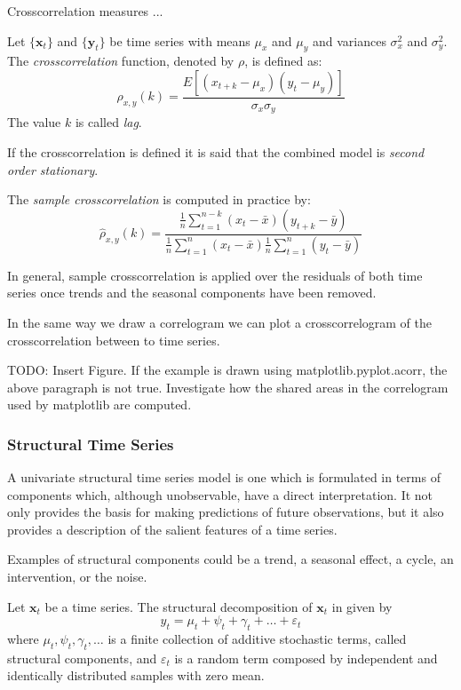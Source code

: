 Crosscorrelation measures ...

\begin{definition}
Let $\{\mathbf{x}_t\}$ and $\{\mathbf{y}_t\}$ be time series with means $\mu_x$ and $\mu_y$ and variances $\sigma_x^2$ and $\sigma_y^2$. The \emph{crosscorrelation} function, denoted by $\rho$, is defined as:
\[
\rho_{x,y}(k) = \frac{E\left[\left(x_{t+k}-\mu_x\right)\left(y_t-\mu_y\right)\right]}{\sigma_x \sigma_y}
\]
The value $k$ is called \emph{lag}.
\end{definition}

If the crosscorrelation is defined it is said that the combined model is \emph{second order stationary}.

The \emph{sample crosscorrelation} is computed in practice by:
\[
\hat{\rho}_{x,y}(k) = \frac{ \frac{1}{n}\sum_{t=1}^{n-k}\left(x_{t}-\bar{x}\right)\left(y_{t+k}-\bar{y}\right) }{ \frac{1}{n}\sum_{t=1}^{n}\left(x_{t}-\bar{x}\right) \frac{1}{n}\sum_{t=1}^{n}\left(y_{t}-\bar{y}\right) }
\]

In general, sample crosscorrelation is applied over the residuals of both time series once trends and the seasonal components have been removed.

In the same way we draw a correlogram we can plot a crosscorrelogram of the crosscorrelation between to time series.

\begin{example}
{\color {red} TODO: Insert Figure. If the example is drawn using matplotlib.pyplot.acorr, the above paragraph is not true. Investigate how the shared areas in the correlogram used by matplotlib are computed.}
\end{example}


\subsubsection{Structural Time Series}

{\color{red} A univariate structural time series model is one which is formulated in terms of components which, although unobservable, have a direct interpretation. It not only provides the basis for making predictions of future observations, but it also provides a description of the salient features of a time series.}

Examples of structural components could be a trend, a seasonal effect, a cycle, an intervention, or the noise.

\begin{definition}
Let $\mathbf{x}_t$ be a time series. The structural decomposition of $\mathbf{x}_t$ in given by
\[
y_t = \mu_t + \psi_t + \gamma_t + \ldots + \varepsilon_t
\]
where $\mu_t, \psi_t, \gamma_t, \ldots$ is a finite collection of additive stochastic terms, called structural components, and $\varepsilon_t$ is a random term composed by independent and identically distributed samples with zero mean. 
\end{definition}

